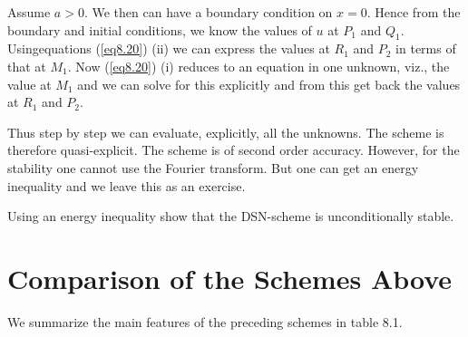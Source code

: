 \begin{exam}
Assume $a>0$. We then can have a boundary condition on $x=0$. Hence
from the boundary and initial conditions, we know the values of $u$ at
$P_1$ and $Q_1$. 
Using\pageoriginale equations (\ref{eq8.20}) (ii) we can express the
values at $R_1$ and $P_2$ in terms of that at $M_1$. Now
(\ref{eq8.20}) (i) reduces to an equation in one unknown, viz., the
value at $M_1$ and we can solve for this explicitly and from this get
back the values at $R_1$ and $P_2$. 

Thus step by step we can evaluate, explicitly, all the unknowns. The
scheme is therefore quasi-explicit. The scheme is of second order
accuracy. However, for the stability one cannot use the Fourier
transform. But one can get an energy inequality and we leave this as
an exercise. 
\end{exam}

\begin{exercise}\label{chap8:exer8.3}
Using an energy inequality show that the DSN-scheme is unconditionally
stable. 
\end{exercise}


\section{Comparison of the Schemes Above}\label{chap8:sec8.4}

We summarize the main features of the preceding schemes in table 8.1.

\newpage

